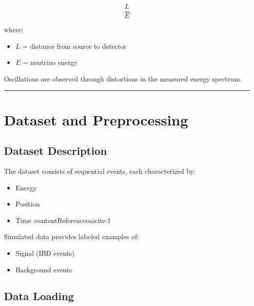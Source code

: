 \documentclass[
  authoryear,
  preprint]{elsarticle}
\providecommand{\tightlist}{%
  \setlength{\itemsep}{0pt}\setlength{\parskip}{0pt}}
\begin{document}
\[
\frac{L}{E}
\]

where:

\begin{itemize}
\tightlist
\item
  \(L\) = distance from source to detector\\
\item
  \(E\) = neutrino energy
\end{itemize}

Oscillations are observed through distortions in the measured energy
spectrum.

\begin{center}\rule{0.5\linewidth}{0.5pt}\end{center}

\section{Dataset and Preprocessing}\label{dataset-and-preprocessing}

\subsection{Dataset Description}\label{dataset-description}

The dataset consists of sequential events, each characterized by:

\begin{itemize}
\tightlist
\item
  Energy
\item
  Position
\item
  Time :contentReference{oaicite:1}
\end{itemize}

Simulated data provides labeled examples of:

\begin{itemize}
\tightlist
\item
  Signal (IBD events)
\item
  Background events
\end{itemize}

\subsection{Data Loading}\label{data-loading}
\end{document}
